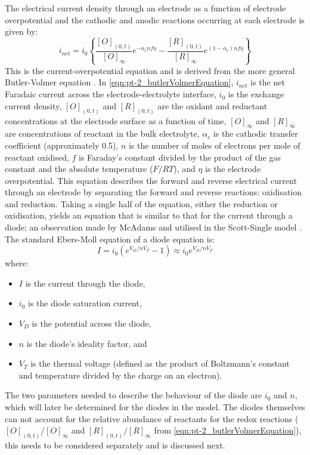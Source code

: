     The electrical current density through an electrode as a function of electrode overpotential and the cathodic and anodic reactions occurring at each electrode is given by:
    \begin{equation}
      i_{net} = i_{0} \left\{ \frac{[O]_{(0,t)}}{[O]_{\infty}}e^{-\alpha_{c}nf\eta} - \frac{[R]_{(0,t)}}{[R]_{\infty}}e^{(1-\alpha_{c})nf\eta}\right\}
      \label{eqn:pt-2_butlerVolmerEquation}
    \end{equation}
    This is the current-overpotential equation and is derived from the more general Butler-Volmer equation \cite{Merrill2005,ScottSingle2013}.
    In \cref{eqn:pt-2_butlerVolmerEquation}, $i_{net}$ is the net Faradaic current across the electrode-electrolyte interface,
    $i_{0}$ is the exchange current density,
    $[O]_{(0,t)}$ and $[R]_{(0,t)}$ are the oxidant and reductant concentrations at the electrode surface as a function of time,
    $[O]_{\infty}$ and $[R]_{\infty}$ are concentrations of reactant in the bulk electrolyte,
    $\alpha_{c}$ is the cathodic transfer coefficient (approximately 0.5),
    $n$ is the number of moles of electrons per mole of reactant oxidised,
    $f$ is Faraday's constant divided by the product of the gas constant and the absolute temperature ($F/RT$),
    and $\eta$ is the electrode overpotential.
    This equation describes the forward and reverse electrical current through an electrode by separating the forward and reverse reactions: oxidisation and reduction.
    Taking a single half of the equation, either the reduction or oxidisation, yields an equation that is similar to that for the current through a diode; an observation made by McAdams and utilised in the Scott-Single model \cite{McAdams1995}.
    The standard Ebers-Moll equation of a diode equation is:
    \begin{equation}
      I = i_0\left(e^{V_D / n V_T}-1\right) \approx i_0 e^{V_D / n V_T}
      \label{eqn:pt-2_diodeEquation}
    \end{equation}
    where:
    \begin{itemize}
      \item $I$ is the current through the diode,
      \item $i_0$ is the diode saturation current,
      \item $V_D$ is the potential across the diode,
      \item $n$ is the diode's ideality factor, and
      \item $V_T$ is the thermal voltage (defined as the product of Boltzmann's constant and temperature divided by the charge on an electron).
    \end{itemize}
    The two parameters needed to describe the behaviour of the diode are $i_0$ and $n$, which will later be determined for the diodes in the model.
    The diodes themselves can not account for the relative abundance of reactants for the redox reactions ($[O]_{(0,t)}/[O]_{\infty}$ and $[R]_{(0,t)}/[R]_{\infty}$ from \cref{eqn:pt-2_butlerVolmerEquation}), this needs to be considered separately and is discussed next.


